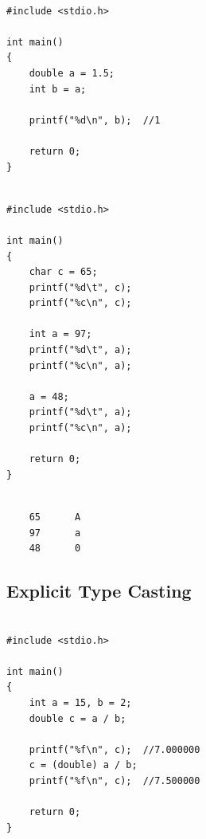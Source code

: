 \documentclass[12pt]{article}
\begin{document}
\begin{verbatim}

#include <stdio.h>

int main()
{
    double a = 1.5;
    int b = a;

    printf("%d\n", b);  //1

    return 0;
}

\end{verbatim}

\newpage

\begin{verbatim}

#include <stdio.h>

int main()
{
    char c = 65;
    printf("%d\t", c);
    printf("%c\n", c);

    int a = 97;
    printf("%d\t", a);
    printf("%c\n", a);

    a = 48;
    printf("%d\t", a);
    printf("%c\n", a);

    return 0;
}

\end{verbatim}

\begin{verbatim}

    65      A
    97      a
    48      0

\end{verbatim}

\newpage
{}
\subsection*{Explicit Type Casting}

\begin{verbatim}

#include <stdio.h>

int main()
{
    int a = 15, b = 2;
    double c = a / b;

    printf("%f\n", c);  //7.000000
    c = (double) a / b;
    printf("%f\n", c);  //7.500000

    return 0;
}

\end{verbatim}
\end{document}
